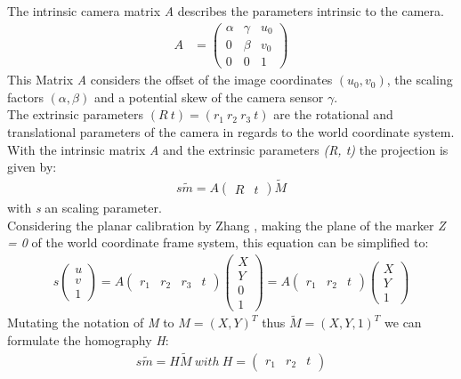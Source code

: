\documentclass[conference]{IEEEtran}
\begin{document}
The intrinsic camera matrix \textit{A} describes the parameters intrinsic to the camera.
\begin{align*}
	A &= \begin{pmatrix}	\alpha& \gamma & u_0\\
											0& \beta& v_0\\
											0&0&1
	\end{pmatrix}
\end{align*}
This Matrix \textit{A} considers the offset of the image coordinates \textit{$(u_0,v_0)$}, the scaling factors \textit{$(\alpha,\beta)$} and a potential skew of the camera sensor \textit{$\gamma$}.\\
The extrinsic parameters \textit{$(R\ t) = (r_1\ r_2\ r_3\ t)$} are the rotational and translational parameters of the camera in regards to the world coordinate system.
With the intrinsic matrix \textit{A} and the extrinsic parameters \textit{(R, t)} the projection is given by:
\begin{align*}
	s\tilde{m} = A
	\begin{pmatrix}
		R&t
	\end{pmatrix}\tilde{M}
\end{align*}
with \textit{s} an scaling parameter.\\
Considering the planar calibration by Zhang \cite{camercalibrationzhang}, making the plane of the marker \textit{Z = 0} of the world coordinate frame system, this equation can be simplified to:
\begin{align*}
	s
	\begin{pmatrix}
		u\\v\\1
	\end{pmatrix}
	=A
	\begin{pmatrix}
		r_1&r_2&r_3&t
	\end{pmatrix}
	\begin{pmatrix}
		X\\Y\\0\\1
	\end{pmatrix}
		=A
	\begin{pmatrix}
		r_1&r_2&t
	\end{pmatrix}
	\begin{pmatrix}
		X\\Y\\1
	\end{pmatrix}
\end{align*}
Mutating the notation of \textit{M} to \textit{$M = (X,Y)^T$} thus \textit{$\tilde{M} = (X,Y,1)^T$} we can formulate the homography \textit{H}:
\begin{align*}
	s\tilde{m}=H\tilde{M}\ with\ 
	H =
	\begin{pmatrix}
	r_1&r_2&t
	\end{pmatrix}
\end{align*}
\end{document}
